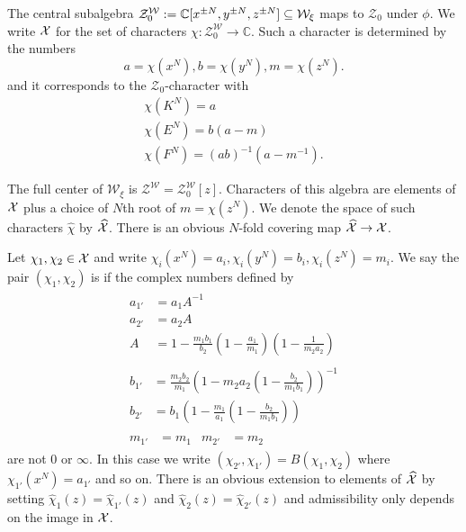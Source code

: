 \documentclass{sl2ams}
\numberwithin{equation}{section}
\newcommand{\CC}{\mathbb{C}}
\newcommand{\Z}{\mathcal{Z}}
\newcommand{\W}{\mathcal{W}}
\begin{document}
\begin{definition}
  The central subalgebra \(\Z_0^\W \defeq \CC[x^{\pm N}, y^{\pm N}, z^{\pm N}] \subseteq \W_\xi\) maps to \(\Z_0\) under \(\phi\).
  We write \(\mathcal{X}\) for the set of characters \(\chi : \Z_0^\W \to \CC\).
  Such a character is determined by the numbers
  \[
    a = \chi(x^N), b = \chi(y^N), m = \chi(z^N).
  \]
  and it corresponds to the \(\Z_0\)-character with
  \begin{gather*}
    \chi(K^{N})  = a
    \\
    \chi(E^{N})  = b(a - m)
    \\
    \chi(F^{N}) = (ab)^{-1}(a - m^{-1}).
  \end{gather*}

  The full center of \(\W_\xi\) is \(\Z^\W = \Z_0^\W[z]\).
  Characters of this algebra are elements of \(\mathcal{X}\) plus a choice of \(N\)th root of \(m = \chi(z^N)\).
  We denote the space of such characters \(\hat \chi\) by \(\widehat{\mathcal{X}}\).
  There is an obvious \(N\)-fold covering map \(\widehat{\mathcal{X}} \to \mathcal{X}\).
\end{definition}

\begin{definition}
  \label{def:braiding}
  Let \(\chi_1, \chi_2 \in \mathcal{X}\) and write \(\chi_i(x^N) = a_i, \chi_i(y^N) = b_i, \chi_i(z^N) = m_i\).
  We say the pair \((\chi_1, \chi_2)\) is  if the complex numbers defined by
  \begin{gather}
    \label{eq:a-transf-positive}
    \begin{aligned}
      a_{1'}
      &=
      a_1 A^{-1}
      \\
      a_{2'}
      &=
      a_2 A
      \\
      A &= 1 - \frac{m_1 b_1}{b_2} \left(1 - \frac{a_1}{m_1}\right)\left(1 - \frac{1}{m_2 a_2}\right)
    \end{aligned}
    \\
    \label{eq:b-transf-positive}
    \begin{aligned}
      b_{1'}
      &=
      \frac{m_2 b_2}{m_1}
      \left(
        1 - m_2 a_2 \left( 1 - \frac{b_2}{m_1 b_1} \right)
      \right)^{-1}
      \\
      b_{2'}
      &=
      b_1
      \left(
        1 - \frac{m_1}{a_1}\left( 1 - \frac{b_2}{m_1 b_1} \right)
      \right)
    \end{aligned}
    \\
    \label{eq:m-transf-positive}
    \begin{aligned}
      m_{1'}
      &= m_1
      &
      m_{2'}
      &= m_2
    \end{aligned}
  \end{gather}
  are not \(0\) or \(\infty\).
  In this case we write \((\chi_{2'} , \chi_{1'}) = B(\chi_1, \chi_2)\) where \(\chi_{1'}(x^N) = a_{1'}\) and so on.
  There is an obvious extension to elements of \(\widehat{\mathcal{X}}\) by setting \(\hat \chi_1(z) = \hat \chi_{1'}(z)\) and \(\hat \chi_2(z) = \hat \chi_{2'}(z)\) and admissibility only depends on the image in \(\mathcal{X}\).
\end{definition}
\end{document}
